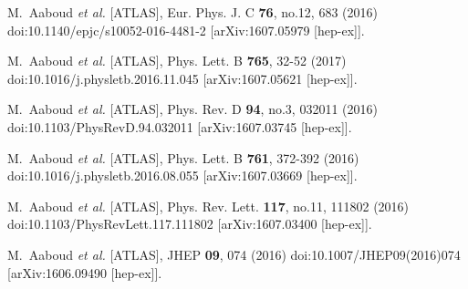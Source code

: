 \begin{thebibliography}{9}
M.~Aaboud \textit{et al.} [ATLAS],
Eur. Phys. J. C \textbf{76}, no.12, 683 (2016)
doi:10.1140/epjc/s10052-016-4481-2
[arXiv:1607.05979 [hep-ex]].

M.~Aaboud \textit{et al.} [ATLAS],
Phys. Lett. B \textbf{765}, 32-52 (2017)
doi:10.1016/j.physletb.2016.11.045
[arXiv:1607.05621 [hep-ex]].

M.~Aaboud \textit{et al.} [ATLAS],
Phys. Rev. D \textbf{94}, no.3, 032011 (2016)
doi:10.1103/PhysRevD.94.032011
[arXiv:1607.03745 [hep-ex]].

M.~Aaboud \textit{et al.} [ATLAS],
Phys. Lett. B \textbf{761}, 372-392 (2016)
doi:10.1016/j.physletb.2016.08.055
[arXiv:1607.03669 [hep-ex]].

M.~Aaboud \textit{et al.} [ATLAS],
Phys. Rev. Lett. \textbf{117}, no.11, 111802 (2016)
doi:10.1103/PhysRevLett.117.111802
[arXiv:1607.03400 [hep-ex]].

M.~Aaboud \textit{et al.} [ATLAS],
JHEP \textbf{09}, 074 (2016)
doi:10.1007/JHEP09(2016)074
[arXiv:1606.09490 [hep-ex]].


\end{thebibliography}
